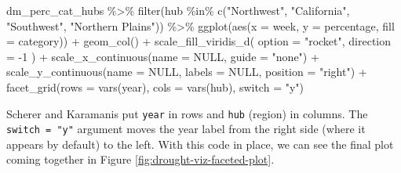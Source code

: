 \documentclass[
]{book}
\newenvironment{Shaded}{\begin{snugshade}}{\end{snugshade}}
\newcommand{\AttributeTok}[1]{\textcolor[rgb]{0.77,0.63,0.00}{#1}}
\newcommand{\ConstantTok}[1]{\textcolor[rgb]{0.00,0.00,0.00}{#1}}
\newcommand{\DecValTok}[1]{\textcolor[rgb]{0.00,0.00,0.81}{#1}}
\newcommand{\FunctionTok}[1]{\textcolor[rgb]{0.00,0.00,0.00}{#1}}
\newcommand{\NormalTok}[1]{#1}
\newcommand{\SpecialCharTok}[1]{\textcolor[rgb]{0.00,0.00,0.00}{#1}}
\newcommand{\StringTok}[1]{\textcolor[rgb]{0.31,0.60,0.02}{#1}}
\begin{document}
\begin{Shaded}
\begin{Highlighting}[]
\NormalTok{dm\_perc\_cat\_hubs }\SpecialCharTok{\%\textgreater{}\%}
  \FunctionTok{filter}\NormalTok{(hub }\SpecialCharTok{\%in\%} \FunctionTok{c}\NormalTok{(}\StringTok{"Northwest"}\NormalTok{, }
                    \StringTok{"California"}\NormalTok{, }
                    \StringTok{"Southwest"}\NormalTok{, }
                    \StringTok{"Northern Plains"}\NormalTok{)) }\SpecialCharTok{\%\textgreater{}\%}
  \FunctionTok{ggplot}\NormalTok{(}\FunctionTok{aes}\NormalTok{(}\AttributeTok{x =}\NormalTok{ week, }
             \AttributeTok{y =}\NormalTok{ percentage,}
             \AttributeTok{fill =}\NormalTok{ category)) }\SpecialCharTok{+}
  \FunctionTok{geom\_col}\NormalTok{() }\SpecialCharTok{+}
  \FunctionTok{scale\_fill\_viridis\_d}\NormalTok{(}
    \AttributeTok{option =} \StringTok{"rocket"}\NormalTok{,}
    \AttributeTok{direction =} \SpecialCharTok{{-}}\DecValTok{1}
\NormalTok{  ) }\SpecialCharTok{+}
  \FunctionTok{scale\_x\_continuous}\NormalTok{(}\AttributeTok{name =} \ConstantTok{NULL}\NormalTok{, }
                     \AttributeTok{guide =} \StringTok{"none"}\NormalTok{) }\SpecialCharTok{+}
  \FunctionTok{scale\_y\_continuous}\NormalTok{(}\AttributeTok{name =} \ConstantTok{NULL}\NormalTok{, }
                     \AttributeTok{labels =} \ConstantTok{NULL}\NormalTok{, }
                     \AttributeTok{position =} \StringTok{"right"}\NormalTok{) }\SpecialCharTok{+}
  \FunctionTok{facet\_grid}\NormalTok{(}\AttributeTok{rows =} \FunctionTok{vars}\NormalTok{(year), }
             \AttributeTok{cols =} \FunctionTok{vars}\NormalTok{(hub), }
             \AttributeTok{switch =} \StringTok{"y"}\NormalTok{)}
\end{Highlighting}
\end{Shaded}

Scherer and Karamanis put \texttt{year} in rows and \texttt{hub} (region) in columns. The \texttt{switch\ =\ "y"} argument moves the year label from the right side (where it appears by default) to the left. With this code in place, we can see the final plot coming together in Figure \ref{fig:drought-viz-faceted-plot}.
\end{document}
